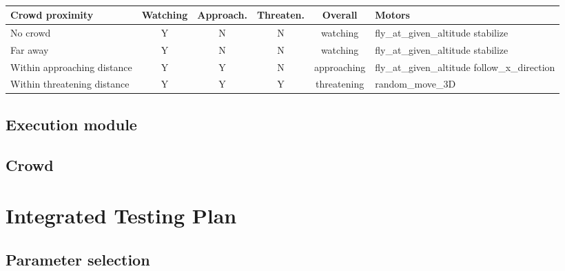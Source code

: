 \begin{table}[htb]
\renewcommand{\arraystretch}{1.3}
\centering
\begin{tabular}{|p{3.1 cm}|c|c|c|c|p{3 cm}|}
\hline
\textbf{Crowd proximity} & \textbf{Watching} & \textbf{Approach.} & \textbf{Threaten.}   & \textbf{Overall} & \textbf{Motors}\\
\hline
No crowd & Y & N & N & watching &  fly\_at\_given\_altitude \newline stabilize\\
\hline
Far away & Y & N & N & watching &  fly\_at\_given\_altitude \newline stabilize\\
\hline
Within approaching \newline distance & Y & Y & N & approaching & fly\_at\_given\_altitude \newline follow\_x\_direction\\
\hline
Within threatening \newline distance & Y & Y & Y &  threatening & random\_move\_3D \\
\hline
\end{tabular}		
\caption {} \label{behavior}
\end{table}

\subsection{Execution module}

\subsection{Crowd}

\section{Integrated Testing Plan}

\subsection{Parameter selection}




